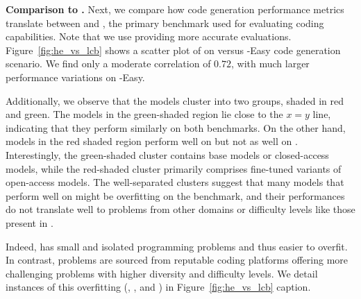 \noindent \textbf{Comparison to \humaneval{}.}
Next, we compare how code generation performance metrics translate between \livecodebench{} and \humaneval{}, 
the primary benchmark used for evaluating coding capabilities.
Note that we use \humanevalplus{} providing more accurate evaluations.
Figure~\ref{fig:he_vs_lcb} shows a scatter plot of  on \humanevalplus{} versus \lcb{}-Easy code generation scenario. 
We find only a moderate correlation of $0.72$, with much larger performance variations on \lcb{}-Easy.

Additionally, we observe that the models cluster into two groups, shaded in red and green.
The models in the green-shaded region lie close to the $x=y$ line, indicating that they perform similarly on both benchmarks.
On the other hand, models in the red shaded region  perform well  on \humanevalplus{} but not as well on \livecodebench{}.
Interestingly, the green-shaded cluster contains base models or closed-access models, 
while the red-shaded cluster primarily comprises fine-tuned variants of open-access models.
The well-separated clusters suggest that many models that perform well on \humaneval{} might be overfitting on the benchmark, and their performances do not translate well to problems from other domains or difficulty levels like those present in \livecodebench{}. %

Indeed, \humaneval{} has small and isolated programming problems and thus easier to overfit.
In contrast, \livecodebench{} problems are sourced from reputable coding platforms offering more challenging problems with higher diversity and difficulty levels.
We detail instances of this overfitting (, , and \codeqwen{}) in Figure~\ref{fig:he_vs_lcb} caption.

